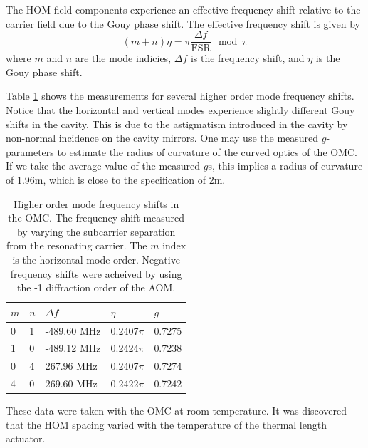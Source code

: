 The HOM field components experience an effective frequency shift relative to the  carrier field due to the Gouy phase shift. %
The effective frequency shift is given by
\begin{equation}
\label{eqn:gouyshift}
(m+n)\eta=\pi\frac{\Delta f}{\mathrm{FSR}}\mod \pi
\end{equation}
where $m$ and $n$ are the  mode indicies, $\Delta f$ is the frequency shift, and $\eta$ is the Gouy phase shift. %


Table \ref{tab:HOM} shows the measurements for several higher order mode frequency shifts. %
Notice that the horizontal and vertical modes experience slightly different Gouy shifts in the cavity. %
This is due to the astigmatism introduced in the cavity by non-normal incidence on the cavity mirrors. %
One may use the measured $g$-parameters to estimate the radius of curvature of the curved optics of the OMC. %
If we take the average value of the measured $g$s, this implies a radius of curvature of 1.96m, which is close to the specification of 2m.

\begin{table}
  \begin{center}
    \begin{tabular}{lll|ll}
      \hline
      $m$ & $n$ & $\Delta f$ & $\eta$ & $g$ \\
      \hline
      0 & 1 & -489.60 MHz & 0.2407$\pi$ & 0.7275\\
      1 & 0 & -489.12 MHz & 0.2424$\pi$ & 0.7238\\
      0 & 4 &  267.96 MHz & 0.2407$\pi$ & 0.7274\\
      4 & 0 &  269.60 MHz & 0.2422$\pi$ & 0.7242\\
      \hline
    \end{tabular}
  \caption[Higher order mode frequency shifts in the OMC]{Higher order mode frequency shifts in the OMC. The frequency shift measured by varying the subcarrier separation from the resonating carrier. The $m$ index is the horizontal mode order. Negative frequency shifts were acheived by using the -1 diffraction order of the AOM.}
  \label{tab:HOM}
  \end{center}
\end{table}

These data were taken with the OMC at room temperature. %
It was discovered that the HOM spacing varied with the temperature of the thermal length actuator. %


